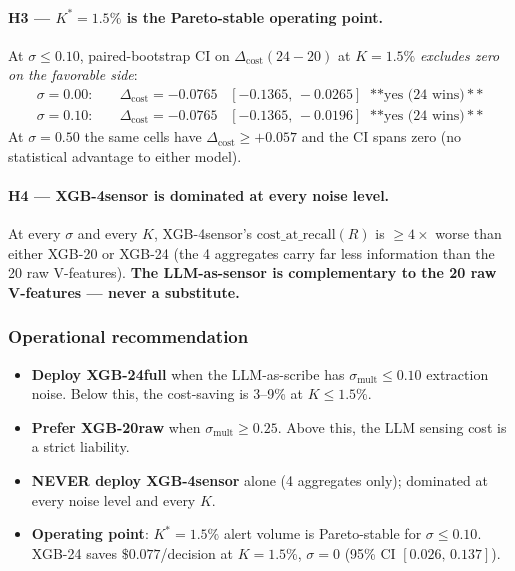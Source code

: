 \documentclass{article}
\begin{document}
\paragraph{H3 --- $K^* = 1.5\%$ is the Pareto-stable operating point.}
At $\sigma \le 0.10$, paired-bootstrap CI on
$\Delta_{\mathrm{cost}}(24{-}20)$ at $K = 1.5\%$ \emph{excludes zero on
the favorable side}:
\begin{align*}
  \sigma = 0.00: &\quad \Delta_{\text{cost}} = -0.0765 \;\;\;[-0.1365,\,-0.0265] \;\;\text{**yes (24 wins)}** \\
  \sigma = 0.10: &\quad \Delta_{\text{cost}} = -0.0765 \;\;\;[-0.1365,\,-0.0196] \;\;\text{**yes (24 wins)}**
\end{align*}
At $\sigma = 0.50$ the same cells have $\Delta_{\text{cost}} \ge
+0.057$ and the CI spans zero (no statistical advantage to either model).

\paragraph{H4 --- XGB-4sensor is dominated at every noise level.}
At every $\sigma$ and every $K$, XGB-4sensor's
$\mathrm{cost\_at\_recall}(R)$ is $\ge 4\times$ worse than either XGB-20 or
XGB-24 (the 4 aggregates carry far less information than the 20 raw V-features).
\textbf{The LLM-as-sensor is complementary to the 20 raw V-features
--- never a substitute.}

\subsubsection{Operational recommendation}
\begin{itemize}
\item \textbf{Deploy XGB-24full} when the LLM-as-scribe has
      $\sigma_{\text{mult}} \le 0.10$ extraction noise. Below this, the
      cost-saving is 3--9\% at $K \le 1.5\%$.
\item \textbf{Prefer XGB-20raw} when $\sigma_{\text{mult}} \ge 0.25$.
      Above this, the LLM sensing cost is a strict liability.
\item \textbf{NEVER deploy XGB-4sensor} alone (4 aggregates only);
      dominated at every noise level and every $K$.
\item \textbf{Operating point}: $K^* = 1.5\%$ alert volume is
      Pareto-stable for $\sigma \le 0.10$. XGB-24 saves
      $\$0.077$/decision at $K = 1.5\%$, $\sigma = 0$ (95\% CI
      $[0.026,\, 0.137]$).
\end{itemize}
\end{document}
